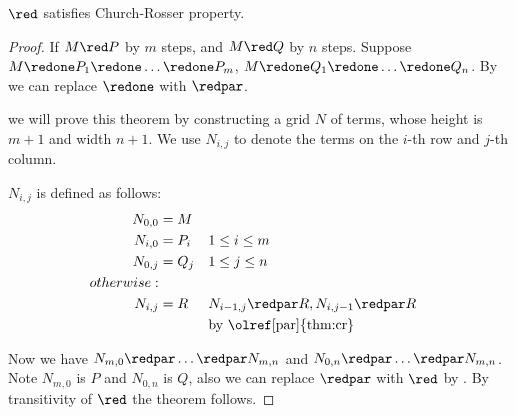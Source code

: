 \documentclass[../../../include/open-logic-section]{subfiles}
\begin{document}
\begin{thm}
  $\red$ satisfies Church-Rosser property.
\end{thm}
\begin{proof}
  If $M \red P$ by $m$ steps, and $M \red Q$ by $n$ steps.  Suppose $M \redone P_1 \redone \ldots \redone P_m$, $M \redone Q_1
  \redone \ldots \redone Q_n$. By  we can replace
  $\redone$ with $\redpar$.
  
  we will prove this theorem by constructing a grid $N$ of terms, whose height is $m + 1$ and width $n + 1$. We use $N_{i,j}$ to denote the terms
  on the $i$-th row and $j$-th column.

  $N_{i,j}$ is defined as follows:
  \begin{align*}
    N_{0,0} &= M \\
    N_{i,0} &= P_i && 1 \le i \le m \\
    N_{0,j} &= Q_j && 1 \le j \le n \\
    otherwise: & \\
    N_{i,j} &= R && N_{i-1,j} \redpar R, N_{i,j-1} \redpar R \\
    & && \text{by \olref[par]{thm:cr}}
  \end{align*}

  Now we have $N_{m,0} \redpar \ldots \redpar N_{m,n}$ and $N_{0,n}
  \redpar \ldots \redpar N_{m,n}$. Note $N_{m,0}$ is $P$ and $N_{0,n}$
  is $Q$, also we can replace $\redpar$ with $\red$ by
  . By transitivity of $\red$ the theorem follows.
\end{proof}
\end{document}
